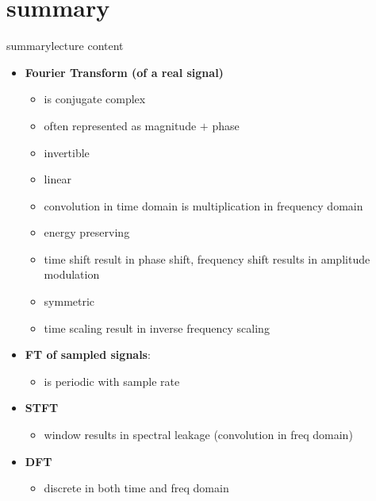     \section{summary}
        \begin{frame}{summary}{lecture content}
            \begin{itemize}
                \item   \textbf{Fourier Transform (of a real signal)}
                    \begin{itemize}
                        \item   is conjugate complex
                        \item   often represented as magnitude $+$ phase
                        \item   invertible
                        \item   linear
                        \item   convolution in time domain is multiplication in frequency domain
                        \item   energy preserving
                        \item   time shift result in phase shift, frequency shift results in amplitude modulation
                        \item   symmetric
                        \item   time scaling result in inverse frequency scaling
                    \end{itemize}
                \item   \textbf{FT of sampled signals}:
                    \begin{itemize}
                        \item   is periodic with sample rate
                    \end{itemize}
                \item   \textbf{STFT}
                    \begin{itemize}
                        \item   window results in spectral leakage (convolution in freq domain)
                    \end{itemize}
                \item   \textbf{DFT}
                    \begin{itemize}
                        \item   discrete in both time and freq domain
                    \end{itemize}
            \end{itemize}
        \end{frame}

